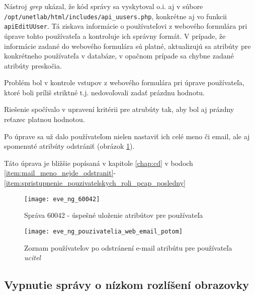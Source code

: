 \begin{comment}
\begin{figure}
    \centering
    \texttt{[image: eve\_ng\_pouzivatelia\_web\_email\_predtym]}
    \caption{Stav pred odstránením e-mail atribútu používateľa \emph{ucitel}}
    \label{obr:eve_ng_pouzivatelia_web_email_predtym}
\end{figure}
\end{comment}

Nástroj \emph{grep} ukázal, že kód správy sa vyskytoval o.i. aj v súbore \\
\texttt{/opt/unetlab/html/includes/api\_uusers.php}, konkrétne aj vo funkcii \texttt{apiEditUUser}. Tá ziskava informácie o používateľovi z webového formulára pri úprave tohto používateľa a kontroluje ich správny formát. V prípade, že informácie zadané do webového formulára sú platné, aktualizujú sa atribúty pre konkrétneho používateľa v databáze, v opačnom prípade sa chybne zadané atribúty preskočia.

Problém bol v kontrole vstupov z webového formulára pri úprave používateľa, ktoré boli príliš striktné t.j. nedovoľovali zadať prázdnu hodnotu.

Riešenie spočívalo v upravení kritérii pre atrubúty tak, aby bol aj prázdny reťazec platnou hodnotou.

Po úprave sa už dalo používateľom nielen nastaviť ich celé meno či email, ale aj spomenuté atribúty odstrániť (obrázok \ref{obr:eve_ng_pouzivatelia_web_email_potom}).

Táto úprava je bližšie popísaná v kapitole \ref{chap:cd} v bodoch \ref{item:mail_meno_nejde_odstranit}-\ref{item:spristupnenie_pouzivatelskych_roli_pcap_posledny}

\begin{figure}
    \centering
    \texttt{[image: eve\_ng\_60042]}
    \caption{Správa 60042 - úspešné uloženie atribútov pre používateľa}
    \label{obr:eve_ng_60042}
    
    \centering
    \texttt{[image: eve\_ng\_pouzivatelia\_web\_email\_potom]}
    \caption{Zoznam používateľov po odstránení e-mail atribútu pre používateľa \emph{ucitel}}
    \label{obr:eve_ng_pouzivatelia_web_email_potom}
\end{figure}






\subsection{Vypnutie správy o nízkom rozlíšení obrazovky}

